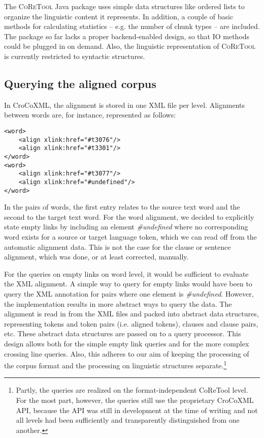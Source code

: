 \documentclass[output=paper]{LSP/langsci}
\begin{document}
The \textsc{CoReTool} Java package uses simple data structures like ordered lists to organize the linguistic content it represents. In addition, a couple of basic methods for calculating statistics -- e.g. the number of chunk types -- are included. The package so far lacks a proper backend-enabled design, so that IO methods could be plugged in on demand. Also, the linguistic representation of \textsc{CoReTool} is currently restricted to syntactic structures.

\subsection{Querying the aligned corpus}\label{sec:culo:3.3}

In CroCoXML, the alignment is stored in one XML file per level. Alignments between words are, for instance, represented as follows:

\ea
\begin{lstlisting}
<word>
    <align xlink:href="#t3076"/>
    <align xlink:href="#t3301"/>
</word>
<word>
    <align xlink:href="#t3077"/>
    <align xlink:href="#undefined"/>
</word> 
\end{lstlisting}
 \z


In the pairs of words, the first entry relates to the source text word and the second to the target text word. For the word alignment, we decided to explicitly state empty links by including an element \textit{\#undefined} where no corresponding word exists for a source or target language token, which we can read off from the automatic alignment data. This is not the case for the clause or sentence alignment, which was done, or at least corrected, manually.

For the queries on empty links on word level, it would be sufficient to evaluate the XML alignment. A simple way to query for empty links would have been to query the XML annotation for pairs where one element is \textit{\#undefined}. However, the implementation results in more abstract ways to query the data. The alignment is read in from the XML files and packed into abstract data structures, representing tokens and token pairs (i.e. aligned tokens), clauses and clause pairs, etc. These abstract data structures are passed on to a query processor. This design allows both for the simple empty link queries and for the more complex crossing line queries. Also, this adheres to our aim of keeping the processing of the corpus format and the processing on linguistic structures separate.\footnote{Partly, the queries are realized on the format-independent CoReTool level. For the most part, however, the queries still use the proprietary CroCoXML API, because the API was still in development at the time of writing and not all levels had been sufficiently and transparently  distinguished from one another.}
\end{document}
